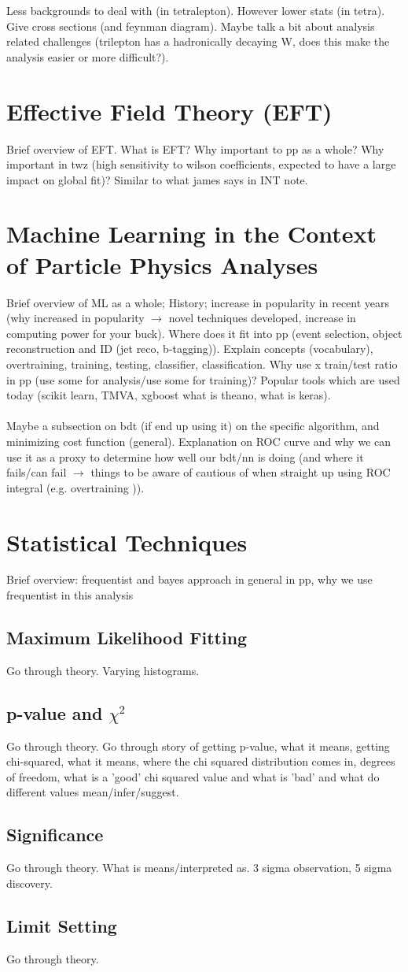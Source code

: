 Less backgrounds to deal with (in tetralepton). However lower stats (in tetra). Give cross sections (and feynman diagram). Maybe talk a bit about analysis related challenges (trilepton has a hadronically decaying W, does this make the analysis easier or more difficult?).

\section{Effective Field Theory (EFT)}
Brief overview of EFT. What is EFT? Why important to pp as a whole? Why important in twz (high sensitivity to wilson coefficients, expected to have a large impact on global fit)? Similar to what james says in INT note.
\section{Machine Learning in the Context of Particle Physics Analyses}
Brief overview of ML as a whole; History; increase in popularity in recent years (why increased in popularity $\rightarrow$ novel techniques developed, increase in computing power for your buck). Where does it fit into pp (event selection, object reconstruction and ID (jet reco, b-tagging)). Explain concepts (vocabulary), overtraining, training, testing, classifier, classification. Why use x train/test ratio in pp (use some for analysis/use some for training)? Popular tools which are used today (scikit learn, TMVA, xgboost what is theano, what is keras).\\\\
Maybe a subsection on bdt (if end up using it) on the specific algorithm, and minimizing cost function (general). Explanation on ROC curve and why we can use it as a proxy to determine how well our bdt/nn is doing (and where it fails/can fail $\rightarrow$ things to be aware of cautious of when straight up using ROC integral (e.g. overtraining )).
\section{Statistical Techniques}
Brief overview: frequentist and bayes approach in general in pp, why we use frequentist in this analysis

\subsection{Maximum Likelihood Fitting}
Go through theory. Varying histograms.
\subsection{p-value and $\chi^2$}
Go through theory. Go through story of getting p-value, what it means, getting chi-squared, what it means, where the chi squared distribution comes in, degrees of freedom, what is a 'good' chi squared value and what is 'bad' and what do different values mean/infer/suggest.
\subsection{Significance}
Go through theory. What is means/interpreted as. 3 sigma observation, 5 sigma discovery. 
\subsection{Limit Setting} 
Go through theory. 







